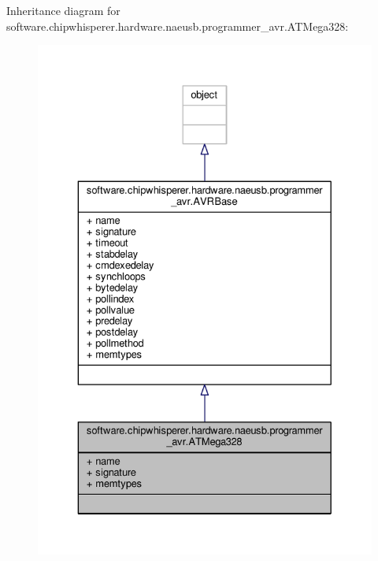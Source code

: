 Inheritance diagram for software.\+chipwhisperer.\+hardware.\+naeusb.\+programmer\+\_\+avr.\+A\+T\+Mega328\+:\nopagebreak
\begin{figure}[H]
\begin{center}
\leavevmode
\includegraphics[width=329pt]{d1/d9c/classsoftware_1_1chipwhisperer_1_1hardware_1_1naeusb_1_1programmer__avr_1_1ATMega328__inherit__graph}
\end{center}
\end{figure}


